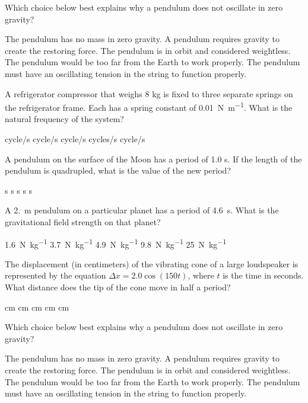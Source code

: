\documentclass{../../../oss-ap12ibhl}
\begin{document}
\begin{questions}
  \question Which choice below best explains why a pendulum does not oscillate
  in zero gravity?
  \begin{choices}
    \choice The pendulum has no mass in zero gravity.
    \choice A pendulum requires gravity to create the restoring force.
    \choice The pendulum is in orbit and considered weightless.
    \choice The pendulum would be too far from the Earth to work properly.
    \choice The pendulum must have an oscillating tension in the string to
    function properly.
  \end{choices}
    
  \question A refrigerator compressor that weighs 8 kg is fixed to three
  separate springs on the refrigerator frame. Each has a spring constant of
  \SI{0.01}{\newton\per\metre}. What is the natural frequency of the system?
  \begin{choices}
     cycle/s
     cycle/s
     cycle/s
     cycles/s
     cycle/s
  \end{choices}
  
  \question A pendulum on the surface of the Moon has a period of 1.0 s. If the
  length of the pendulum is quadrupled, what is the value of the new period?
  \begin{choices}
     s
     s
     s
     s
     s
  \end{choices}
    
  \question A \SI{2.}{\metre} pendulum on a particular planet has a period of
  \SI{4.6}{\second}. What is the gravitational field strength on that planet?
  \begin{choices}
    \choice\SI{1.6}{\newton\per\kilo\gram}
    \choice\SI{3.7}{\newton\per\kilo\gram}
    \choice\SI{4.9}{\newton\per\kilo\gram}
    \choice\SI{9.8}{\newton\per\kilo\gram}
    \choice\SI{25}{\newton\per\kilo\gram}
  \end{choices}

  \question The displacement (in centimeters) of the vibrating cone of a large
  loudspeaker is represented by the equation $\Delta x=2.0\cos(150t)$, where
  $t$ is the time in seconds. What distance does the tip of the cone move in
  half a period?
  \begin{choices}
     cm
     cm
     cm
     cm
     cm
  \end{choices}
  \newpage
  
  \question Which choice below best explains why a pendulum does not oscillate
  in zero gravity?
  \begin{choices}
    \choice The pendulum has no mass in zero gravity.
    \choice A pendulum requires gravity to create the restoring force.
    \choice The pendulum is in orbit and considered weightless.
    \choice The pendulum would be too far from the Earth to work properly.
    \choice The pendulum must have an oscillating tension in the string to
    function properly.
  \end{choices}


\end{questions}
\end{document}
